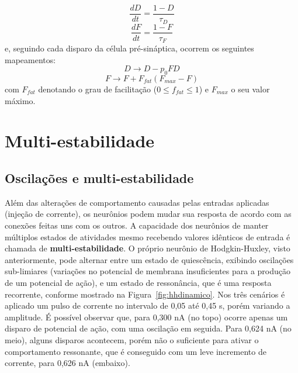 \begin{equation}\label{eq:depressao_sinaptica}
	\frac{dD}{dt}=\frac{1-D}{\tau_D}
\end{equation}
\begin{equation}\label{eq:facilitacao_sinaptica}
	\frac{dF}{dt}=\frac{1-F}{\tau_F}
\end{equation}
e, seguindo cada disparo da célula pré-sináptica, ocorrem os seguintes mapeamentos:
\begin{equation}\label{eq:mapeamento_depressao_sinaptica}
	D\to D-p_0FD
\end{equation}
\begin{equation}\label{eq:mapeamento_facilitacao_sinaptica}
	F\to F+F_{fat}(F_{max}-F)
\end{equation}
com $F_{fat}$ denotando o grau de facilitação ($0\leq f_{fat}\leq 1$) e $F_{max}$ o seu valor máximo.

\section{Multi-estabilidade}\label{sec:biestabilidade}

\subsection{Oscilações e multi-estabilidade}
Além das alterações de comportamento causadas pelas entradas aplicadas (injeção de corrente), os neurônios podem mudar sua resposta de acordo com as conexões feitas uns com os outros. A capacidade dos neurônios de manter múltiplos estados de atividades mesmo recebendo valores idênticos de entrada é chamada de \textbf{multi-estabilidade}. O próprio neurônio de Hodgkin-Huxley, visto anteriormente, pode alternar entre um estado de quiescência, exibindo oscilações sub-limiares (variações no potencial de membrana insuficientes para a produção de um potencial de ação), e um estado de ressonância, que é uma resposta recorrente, conforme mostrado na Figura~\ref{fig:hhdinamico}. Nos três cenários é aplicado um pulso de corrente no intervalo de 0,05 até 0,45 s, porém variando a amplitude. É possível observar que, para 0,300 nA (no topo) ocorre apenas um disparo de potencial de ação, com uma oscilação em seguida. Para 0,624 nA (no meio), alguns disparos acontecem, porém não o suficiente para ativar o comportamento ressonante, que é conseguido com um leve incremento de corrente, para 0,626 nA (embaixo).

